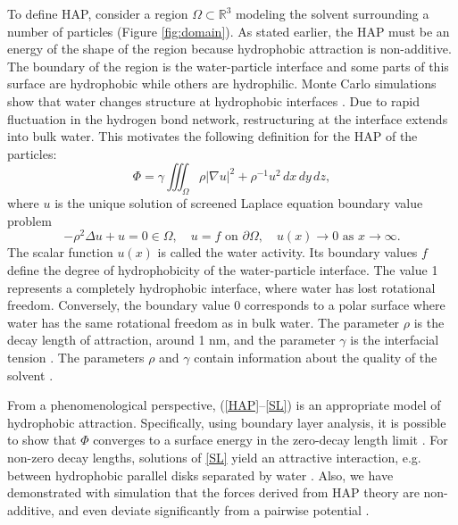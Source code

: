 To define HAP, consider a region $\Omega \subset \mathbb{R}^3$  
modeling the solvent surrounding a number of particles (Figure \ref{fig:domain}).
As stated earlier, the HAP must be an energy of the shape of the region
because hydrophobic attraction is non-additive. 
The boundary of the region is the water-particle interface and some parts of this
surface are hydrophobic while others are hydrophilic. 
Monte Carlo simulations 
show that water changes structure at hydrophobic interfaces \cite{Luzar1987, Jonsson2006,Varilly2011}.
Due to rapid fluctuation in the hydrogen bond network,
restructuring at the interface extends into bulk water.
This motivates the following definition for the HAP of the particles:
\begin{equation}
\label{HAP}
  \Phi = \gamma \iiint_{\Omega} \rho |\nabla u|^2 + \rho^{-1}u^2 \,dx \,dy \,dz, 
\end{equation}
where $u$ is the unique solution of screened Laplace equation boundary value problem 
\begin{equation}
  \label{SL}
  -\rho^2 \Delta u + u = 0 \in \Omega,\quad u = f  \mbox{ on } \partial \Omega, \quad u(x) \to 0 \mbox{ as } x \to \infty.
\end{equation}
The scalar function $u(x)$ is called the water activity. Its boundary values $f$ 
define the degree of hydrophobicity of the water-particle interface. The value 
1 represents a completely hydrophobic interface, where water has lost rotational freedom. 
Conversely, the boundary value 0 corresponds to a polar surface where water has the same rotational
freedom as in bulk water. The parameter $\rho$ is the decay length of attraction, 
around 1 nm, and the parameter $\gamma$ is the interfacial tension \cite{Israelachvili1954}.
The parameters $\rho$ and $\gamma$ contain information about the quality
of the solvent \cite{Discher2002}.

From a phenomenological perspective, (\ref{HAP}--\ref{SL}) 
is an appropriate model of hydrophobic attraction. Specifically,
using boundary layer analysis, it is possible 
to show that $\Phi$ converges to a surface energy in the zero-decay length limit \cite{Lee2018,Lin2015,Shibata2004}.
For non-zero decay lengths, solutions of \eqref{SL} yield an attractive interaction, e.g. between hydrophobic parallel disks
separated by water \cite{Eriksson1989}. Also, we have demonstrated with simulation that the forces 
derived from HAP theory are non-additive, and even deviate significantly from 
a pairwise potential \cite{Meyer2006,Fu19}. 


